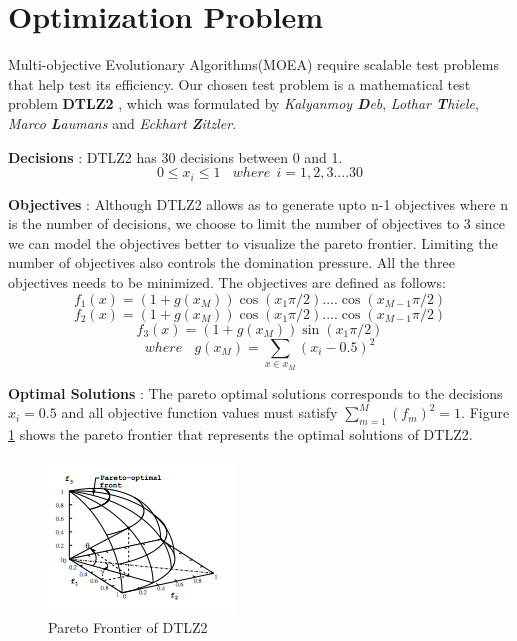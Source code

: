 \documentclass[10pt]{article}
\begin{document}
\section{Optimization Problem}
\label{problem}

Multi-objective Evolutionary Algorithms(MOEA) require scalable test problems that help test its efficiency. Our chosen test problem is a mathematical test problem \textbf{DTLZ2} \cite{debMOEA02}, which was formulated by \textit{Kalyanmoy \textbf{D}eb}, \textit{Lothar \textbf{T}hiele}, \textit{Marco \textbf{L}aumans} and \textit{Eckhart \textbf{Z}itzler}. 

\textbf{Decisions} : DTLZ2 has 30 decisions between 0 and 1.
\[0 \leq {x}_{i} \leq 1 \ \ \ \ where \ \  i = 1,2 ,3 .... 30\]

\textbf{Objectives} : Although DTLZ2 allows as to generate upto n-1 objectives where n is the number of decisions, we choose to limit the number of objectives to 3 since we can model the objectives better to visualize the pareto frontier. Limiting the number of objectives also controls the domination pressure. All the three objectives needs to be minimized. The objectives are defined as follows:
\[{f}_{1}(x) = (1+g({x}_{M}))\cos({x}_{1} \pi/2)....\cos({x}_{M-1} \pi/2)\]
\[{f}_{2}(x) = (1+g({x}_{M}))\cos({x}_{1} \pi/2)....\cos({x}_{M-1} \pi/2)\]
\[{f}_{3}(x) = (1+g({x}_{M}))\sin({x}_{1} \pi/2)\]
\[where \ \ \ \ g({x}_{M}) = \sum_{x \in {x}_{M}} (x_i - 0.5)^2 \]

\textbf{Optimal Solutions} : The pareto optimal solutions corresponds to the decisions \(x_i = 0.5\) and all objective function values must satisfy \(\sum_{m=1}^M (f_m)^2 = 1\). Figure \ref{fig:problem} shows the pareto frontier that represents the optimal solutions of DTLZ2.

\begin{figure}
\centering
\includegraphics{img/dtlz2_pareto.png}
\caption{Pareto Frontier of DTLZ2}
\label{fig:problem}
\end{figure}
\end{document}
